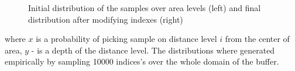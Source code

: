 \begin{figure}[H]
	\caption{Initial distribution of the samples over area levels (left) and final distribution after modifying indexes (right)}
	\label{fig:distributions}
\end{figure}
where $x$ is a probability of picking sample on distance level $i$ from the center of area, $y$ - is a depth of the distance level. The distributions where generated empirically by sampling 10000 indices's over the whole domain of the buffer. 
